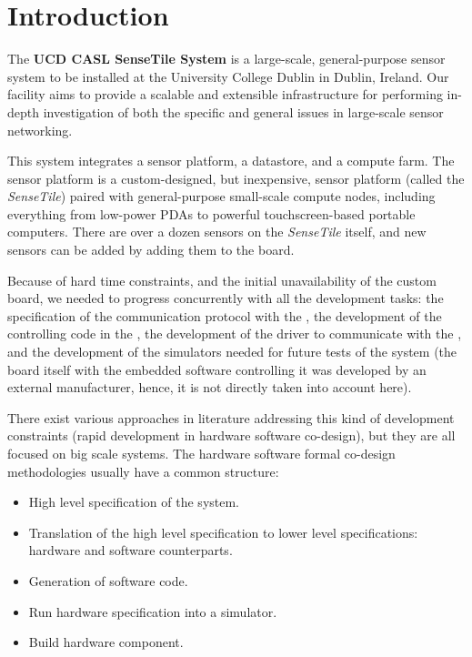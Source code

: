 \documentclass{article} \usepackage{times}
\newcommand{\ST}{\emph{SenseTile}\xspace}
\begin{document}
\section{Introduction}
\label{sec:introduction}

The \textbf{UCD CASL SenseTile System} is a large-scale,
general-purpose sensor system to be installed at the University
College Dublin in Dublin, Ireland.  Our facility aims to provide a
scalable and extensible infrastructure for performing in-depth
investigation of both the specific and general issues in large-scale
sensor networking.

This system integrates a sensor platform, a datastore, and a compute
farm.  The sensor platform is a custom-designed, but inexpensive,
sensor platform (called the \ST) paired with general-purpose
small-scale compute nodes, including everything from low-power PDAs to
powerful touchscreen-based portable computers.  There are over a dozen
sensors on the \ST itself, and new sensors can be added by adding them
to the board.

Because of hard time constraints, and the initial unavailability of
the custom board, we needed to progress concurrently with all the
development tasks: the specification of the communication protocol
with the \STSB, the development of the controlling code in the \STSB,
the development of the driver to communicate with the \STSB, and the
development of the \STSB simulators needed for future tests of the
system (the board itself with the embedded software controlling it was
developed by an external manufacturer, hence, it is not directly taken
into account here).

There exist various approaches in literature addressing this kind of
development constraints (rapid development in hardware software
co-design), but they are all focused on big scale systems.  The
hardware software formal co-design methodologies usually have a common
structure\cite{Slomka2000,Hoffman2001}:

\begin{itemize}
\item High level specification of the system.
\item Translation of the high level specification to lower level
  specifications: hardware and software counterparts.
\item Generation of software code.
\item Run hardware specification into a simulator.
\item Build hardware component.
\end{itemize}
\end{document}

